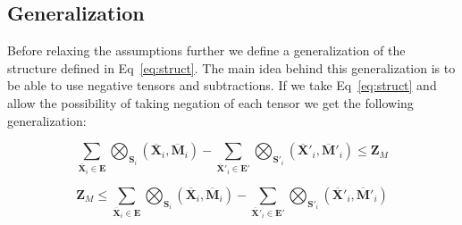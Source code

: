 \documentclass{article}
\newcommand{\TX}{\textbf{X}\xspace}
\newcommand{\TZ}{\textbf{Z}\xspace}
\newcommand{\TM}{\textbf{M}\xspace}
\newcommand{\TE}{\textbf{E}\xspace}
\begin{document}
\subsection{Generalization}
Before relaxing the assumptions further we define a generalization of the structure defined in Eq~\ref{eq:struct}. The main idea behind this generalization is to be able to use negative tensors and subtractions. If we take Eq~\ref{eq:struct} and allow the possibility of taking negation of each tensor we get the following generalization:
%
%
%

\begin{equation}
\label{eq:general1}
	\displaystyle\sum\limits_{\overline{\TX}_i \in \TE}\bigotimes_{\textbf{S}_i}(\overline{\TX}_i,\overline{\TM}_i) - 
	\sum\limits_{\overline{\TX}'_i \in \TE'}\bigotimes_{\textbf{S}'_i}(\overline{\TX}'_i,\overline{\TM}'_i) \le \TZ_{M}
\end{equation}

\begin{equation}
\label{eq:general2}
	\displaystyle\TZ_{M} \le \sum\limits_{\overline{\TX}_i \in \TE}\bigotimes_{\textbf{S}_i}(\overline{\TX}_i,\overline{\TM}_i) - 
	\sum\limits_{\overline{\TX}'_i \in \TE'}\bigotimes_{\textbf{S}'_i}(\overline{\TX}'_i,\overline{\TM}'_i) 
\end{equation}
\end{document}

